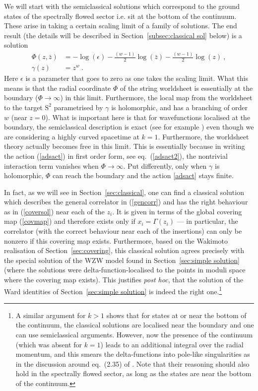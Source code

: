 \documentclass[12pt,a4paper]{article}
\begin{document}
We will start with the semiclassical solutions which correspond to the ground states of the spectrally flowed sector i.e. sit at the bottom of the continuum. These arise in taking a certain scaling limit of a family of solutions. The end result (the details will be described in Section~\ref{subsec:classical sol} below) is a solution
\begin{subequations} \label{coversol}
\begin{align}
\Phi(z,\bar{z}) & =  -\log(\epsilon) -  \tfrac{(w-1)}{2}\log(\bar{z}) - \tfrac{(w-1)}{2}\log(z) \ , \\
\gamma (z) & = z^w \ .
\end{align}
\end{subequations}
Here $\epsilon$ is a parameter that goes to zero as one takes the scaling limit. What this means is that the radial coordinate $\Phi$ of the string worldsheet is essentially at the boundary ($\Phi\rightarrow \infty$) in this limit. Furthermore, the local map from the worldsheet to the target $\mathrm{S}^2$ parametrised by $\gamma$ is holomorphic, and has a branching of order $w$ (near $z=0$). What is important here is that for wavefunctions localised at the boundary, the semiclassical description is exact (see for example \cite{deBoer:1998gyt}) even though we are considering a highly curved spacetime at $k=1$. Furthermore, the worldsheet theory actually becomes free in this limit. 
This is essentially because in writing the action (\ref{adsact}) in first order form, see eq.~(\ref{adsact2}),  the nontrivial interaction term vanishes when $\Phi\rightarrow \infty$. Put differently, only when $\gamma$ is holomorphic, $\Phi$ can reach the boundary and the action \eqref{adsact} stays finite.


In fact, as we will see in Section~\ref{sec:classical}, 
one can find a classical solution which describes the general correlator in (\ref{gencorr}) and has the right behaviour as in (\ref{coversol}) near each of the $z_i$. It is given in terms of the global covering map (\ref{covmap}) and therefore exists only if $x_i=\Gamma(z_i)$ --- in particular, the correlator (with the correct behaviour near each of the insertions) can only be nonzero if this covering map exists. Furthermore, based on the Wakimoto realisation of Section~\ref{sec:covering}, this classical solution agrees precisely with the special solution of the WZW model found in Section~\ref{sec:simple solution} (where the solutions were delta-function-localised to the points in moduli space where the covering map exists). This justifies {\it post hoc}, that the solution of the Ward identities of Section~\ref{sec:simple solution} is indeed the right one.\footnote{A similar argument for $k>1$ shows that for states at or near the bottom of the continuum, the classical solutions are localised near the boundary and one can use semiclassical arguments. However, now the presence of the continuum (which was absent for $k=1$) leads to an additional integral over the radial momentum, and this smears the delta-functions into pole-like singularities as in the discussion around eq.~(2.35) of \cite{Maldacena:2001km}. Note that their reasoning should also hold in the spectrally flowed sector, as long as the states are near the bottom of the continuum.}
\end{document}
